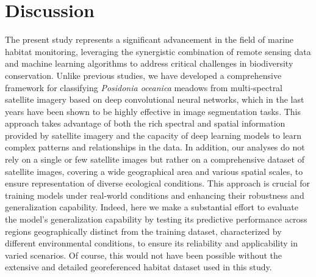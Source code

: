 \section{Discussion}

The present study represents a significant advancement in the field of marine
habitat
monitoring, leveraging the synergistic combination of remote sensing data and
machine learning algorithms to address critical challenges in biodiversity
conservation. Unlike previous studies, we have developed a comprehensive
framework for classifying \textit{Posidonia oceanica} meadows from
multi-spectral satellite imagery based on deep convolutional neural networks,
which in the last years have been shown to be highly effective in image
segmentation tasks. This approach takes advantage of both the rich spectral
and spatial information provided by satellite imagery and the capacity of deep
learning models to learn complex patterns and relationships in the data. In
addition, our analyses do not rely on a single or few satellite images but
rather on a comprehensive dataset of satellite images, covering a wide
geographical area and various spatial scales, to ensure representation of
diverse ecological conditions. This approach is crucial for training models
under real-world conditions and enhancing their robustness and generalization
capability. Indeed, here we make a substantial effort to evaluate the model's
generalization capability by testing its predictive performance across regions
geographically distinct from the training dataset, characterized by different
environmental conditions, to ensure its reliability and applicability in varied
scenarios. Of course, this would not have been possible without the extensive
and detailed georeferenced habitat dataset used in this study.


